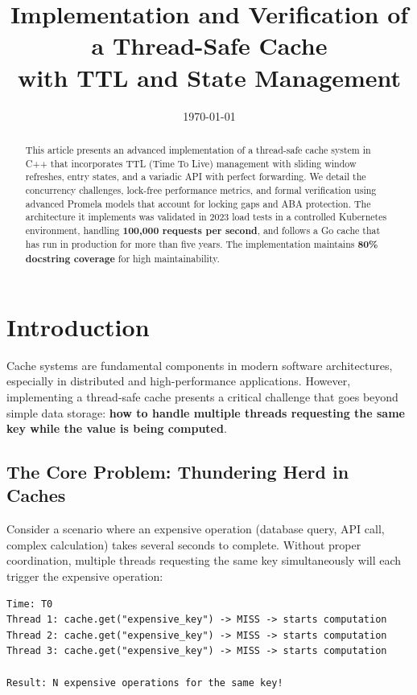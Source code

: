 \documentclass[11pt,a4paper]{article}
\title{Implementation and Verification of a Thread-Safe Cache \\ with TTL and State Management}
\date{\today}
\begin{document}
\maketitle

\begin{abstract}
This article presents an advanced implementation of a thread-safe cache
system in C++ that incorporates TTL (Time To Live) management with
sliding window refreshes, entry states, and a variadic API with perfect
forwarding. We detail the concurrency challenges, lock-free performance
metrics, and formal verification using advanced Promela models that 
account for locking gaps and ABA protection. The architecture it implements
was validated in 2023 load tests in a controlled Kubernetes environment,
handling \textbf{100,000 requests per second}, and follows a Go cache that has
run in production for more than five years. The implementation maintains
\textbf{80\% docstring coverage} for high maintainability.
\end{abstract}

\section{Introduction}

Cache systems are fundamental components in modern software
architectures, especially in distributed and high-performance
applications. However, implementing a thread-safe cache presents a
critical challenge that goes beyond simple data storage: \textbf{how to
handle multiple threads requesting the same key while the value is being
computed}.

\subsection{The Core Problem: Thundering Herd in Caches}

Consider a scenario where an expensive operation (database query, API
call, complex calculation) takes several seconds to complete. Without
proper coordination, multiple threads requesting the same key
simultaneously will each trigger the expensive operation:

\begin{lstlisting}[caption=Problematic behavior without coordination]
Time: T0
Thread 1: cache.get("expensive_key") -> MISS -> starts computation
Thread 2: cache.get("expensive_key") -> MISS -> starts computation  
Thread 3: cache.get("expensive_key") -> MISS -> starts computation

Result: N expensive operations for the same key!
\end{lstlisting}
\end{document}

